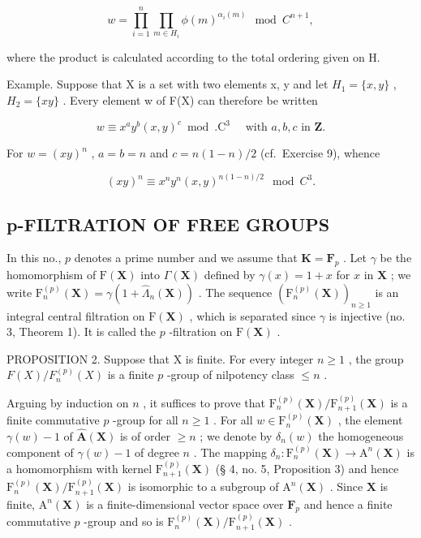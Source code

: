 \[
w = \prod_ {i = 1} ^ {n} \prod_ {m \in H _ {i}} \phi (m) ^ {\alpha_ {i} (m)} \mod C ^ {n + 1},\tag{4}
\]

where the product is calculated according to the total ordering given on H.

Example. Suppose that X is a set with two elements x, y and let \(H_{1} = \{x, y\}\) , \(H_{2} = \{xy\}\) . Every element w of F(X) can therefore be written

\[
w \equiv x ^ {a} y ^ {b} (x, y) ^ {c} \bmod . \mathrm{C} ^ {3} \quad \text { with } a, b, c \text { in } \mathbf {Z}.
\]

For \(w = (xy)^n\) , \(a = b = n\) and \(c = n(1 - n)/2\) (cf.~Exercise 9), whence

\[
(x y) ^ {n} \equiv x ^ {n} y ^ {n} (x, y) ^ {n (1 - n) / 2} \mod C ^ {3}.
\]

\subsection{p-FILTRATION OF FREE GROUPS}

In this no., \(p\) denotes a prime number and we assume that \(\mathbf{K} = \mathbf{F}_p\) . Let \(\gamma\) be the homomorphism of \(\mathrm{F}(\mathbf{X})\) into \(\Gamma(\mathbf{X})\) defined by \(\gamma(x) = 1 + x\) for \(x\) in \(\mathbf{X}\) ; we write \(\mathrm{F}_n^{(p)}(\mathbf{X}) = \gamma(1 + \hat{\Lambda}_n(\mathbf{X}))\) . The sequence \((\mathrm{F}_n^{(p)}(\mathbf{X}))_{n\geq 1}\) is an integral central filtration on \(\mathrm{F}(\mathbf{X})\) , which is separated since \(\gamma\) is injective (no. 3, Theorem 1). It is called the \(p\) -filtration on \(\mathrm{F}(\mathbf{X})\) .

PROPOSITION 2. Suppose that X is finite. For every integer \(n \geqslant 1\) , the group \(F(X) / F_n^{(p)}(X)\) is a finite \(p\) -group of nilpotency class \(\leqslant n\) .

Arguing by induction on \(n\) , it suffices to prove that \(\mathrm{F}_{n}^{(p)}(\mathbf{X}) / \mathrm{F}_{n + 1}^{(p)}(\mathbf{X})\) is a finite commutative \(p\) -group for all \(n \geqslant 1\) . For all \(w \in \mathrm{F}_{n}^{(p)}(\mathbf{X})\) , the element \(\gamma(w) - 1\) of \(\hat{\mathbf{A}}(\mathbf{X})\) is of order \(\geqslant n\) ; we denote by \(\delta_n(w)\) the homogeneous component of \(\gamma(w) - 1\) of degree \(n\) . The mapping \(\delta_n: \mathrm{F}_{n}^{(p)}(\mathbf{X}) \to \mathrm{A}^n (\mathbf{X})\) is a homomorphism with kernel \(\mathrm{F}_{n + 1}^{(p)}(\mathbf{X})\) (§ 4, no. 5, Proposition 3) and hence \(\mathrm{F}_{n}^{(p)}(\mathbf{X}) / \mathrm{F}_{n + 1}^{(p)}(\mathbf{X})\) is isomorphic to a subgroup of \(\mathrm{A}^n (\mathbf{X})\) . Since \(\mathbf{X}\) is finite, \(\mathrm{A}^n (\mathbf{X})\) is a finite-dimensional vector space over \(\mathbf{F}_p\) and hence a finite commutative \(p\) -group and so is \(\mathrm{F}_{n}^{(p)}(\mathbf{X}) / \mathrm{F}_{n + 1}^{(p)}(\mathbf{X})\) .

